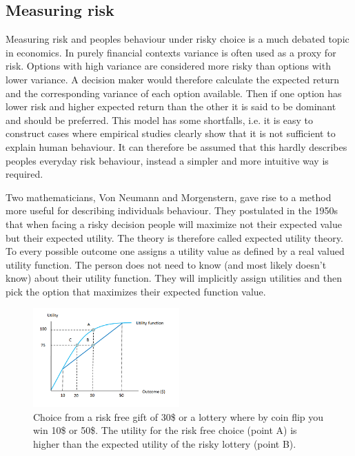 \subsection{Measuring risk}

Measuring risk and peoples behaviour under risky choice is a much debated topic in economics. In purely financial contexts variance is often used as a proxy for risk. Options with high variance are considered more risky than options with lower variance. 
A decision maker would therefore calculate the expected return and the corresponding variance of each option available.
Then if one option has lower risk and higher expected return than the other it is said to be dominant and should be preferred.
This model has some shortfalls, i.e. it is easy to construct cases where empirical studies clearly show that it is not sufficient to explain human behaviour.
It can therefore be assumed that this hardly describes peoples everyday risk behaviour, instead a simpler and more intuitive way is required. \cite{Jaeger00}

Two mathematicians, Von Neumann and Morgenstern, gave rise to a method more useful for describing individuals behaviour. They postulated in the 1950s that when facing a risky decision people will maximize not their expected value but their expected utility. \cite{Morgenstern53}
The theory is therefore called expected utility theory.
To every possible outcome one assigns a utility value as defined by a real valued utility function. The person does not need to know (and most likely doesn't know) about their utility function. They will implicitly assign utilities and then pick the option that maximizes their expected function value.


\begin{figure}[ht]
\centering
\includegraphics[width=0.5\textwidth]{img/background/riskaversion}%
\caption{Choice from a risk free gift of 30\$ or a lottery where by coin flip you win 10\$ or 50\$. The utility for the risk free choice (point A) is higher than the expected utility of the risky lottery (point B). 
}
\label{fig:background:riskaversion}
\end{figure}


